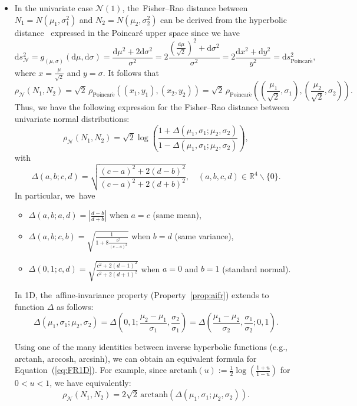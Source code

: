 \documentclass[entropy,article,accept,oneauthor,pdftex,entropy]{Definitions/mdpi}
\def\Poincare{\mathrm{Poincar\acute{e}}}
\def\dsigma{\mathrm{d}\sigma}
\def\arctanh{\mathrm{arctanh}}
\def\bbR{\mathbb{R}}
\def\calN{\mathcal{N}}
\def\dx{\mathrm{d}x}
\def\dy{\mathrm{d}y}
\def\dmu{\mathrm{d}\mu}
\def\ds{\mathrm{d}s}
\def\bbR{\mathbb{R}}
\begin{document}
\begin{itemize}

\item
In the univariate case $\calN(1)$, the~Fisher--Rao distance between $N_1=N(\mu_1,\sigma_1^2)$ and $N_2=N(\mu_2,\sigma_2^2)$ can be derived from the hyperbolic distance~\cite{anderson2006hyperbolic} expressed in the Poincar\'e upper space since we have
$$
\ds^2_\calN=g_{(\mu,\sigma)}(\dmu,\dsigma)=\frac{\dmu^2+2\dsigma^2}{\sigma^2}=2 \frac{\left(\frac{\dmu}{\sqrt{2}}\right)^2+\dsigma^2}{\sigma^2}
=2 \frac{\dx^2+\dy^2}{y^2}=\ds^2_{\Poincare},
$$
where $x=\frac{\mu}{\sqrt{2}}$ and $y=\sigma$.
It follows that 
$$
\rho_\calN(N_1,N_2)=
\sqrt{2}\, \rho_{\Poincare}((x_1,y_1),(x_2,y_2))=
\sqrt{2}\, \rho_{\Poincare}\left(\left(\frac{\mu_1}{\sqrt{2}},\sigma_1\right),\left(\frac{\mu_2}{\sqrt{2}},\sigma_2\right)\right).
$$
Thus, we have the following expression for the Fisher--Rao distance between univariate normal distributions:
\begin{equation}\label{eq:FR1D}
\rho_{\calN}(N_1,N_2)=\sqrt{2}\log \left(\frac{1+\Delta(\mu_1,\sigma_1;\mu_2,\sigma_2)}{1-\Delta(\mu_1,\sigma_1;\mu_2,\sigma_2)}\right)
,
\end{equation}
with
\begin{equation}
\Delta(a,b;c,d)=\sqrt{\frac{(c-a)^2+2(d-b)^2}{(c-a)^2+2(d+b)^2}}, \quad (a,b,c,d)\in\bbR^4\backslash\{0\}.
\end{equation}
In particular, we~have
\begin{itemize}
\item $\Delta(a,b;a,d)=\left|\frac{d-b}{d+b}\right|$ when $a=c$ (same mean),  
\item $\Delta(a,b;c,b)=\sqrt{\frac{1}{1+8\frac{b^2}{(c-a)^2}}}$ when $b=d$ (same variance), 
\item $\Delta(0,1;c,d)=\sqrt{\frac{c^2+2(d-1)^2}{c^2+2(d+1)^2}}$  when $a=0$ and $b=1$ (standard normal).
\end{itemize}
In 1D, the~affine-invariance property (Property~\ref{prop:aifr}) extends to function $\Delta$ as follows:
$$
\Delta(\mu_1,\sigma_1;\mu_2,\sigma_2)=\Delta\left(0,1;\frac{\mu_2-\mu_1}{\sigma_1},\frac{\sigma_2}{\sigma_1}\right)
=\Delta\left(\frac{\mu_1-\mu_2}{\sigma_2},\frac{\sigma_1}{\sigma_2};0,1\right).
$$

Using one of the many identities between inverse hyperbolic functions (e.g., arctanh, arccosh, arcsinh), we can obtain an equivalent formula for Equation~(\ref{eq:FR1D}).
For example, since $\arctanh(u):=\frac{1}{2}\log\left(\frac{1+u}{1-u}\right)$ for $0<u<1$, we have equivalently:
\begin{equation}
\rho_{\calN}(N_1,N_2)= 2\sqrt{2}\,\arctanh(\Delta(\mu_1,\sigma_1;\mu_2,\sigma_2)).
\end{equation}


\end{itemize}
\end{document}
